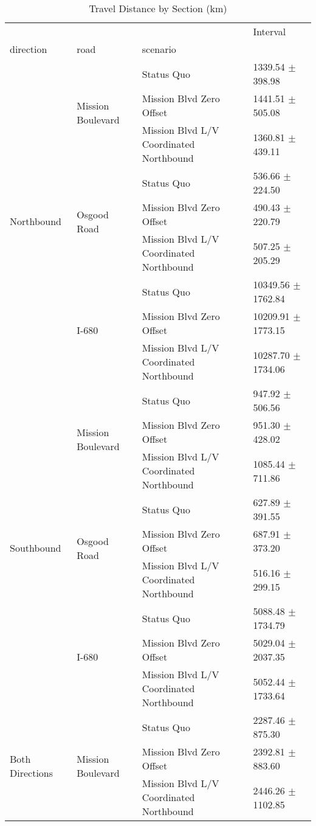 \begin{table}
\caption{Travel Distance by Section (km)}
\begin{tabular}{llll}
\toprule
 &  &  & Interval \\
direction & road & scenario &  \\
\midrule
\multirow[t]{9}{*}{Northbound} & \multirow[t]{3}{*}{Mission Boulevard} & Status Quo & 1339.54 $\pm$ 398.98 \\
 &  & Mission Blvd Zero Offset & 1441.51 $\pm$ 505.08 \\
 &  & Mission Blvd L/V Coordinated Northbound & 1360.81 $\pm$ 439.11 \\
 & \multirow[t]{3}{*}{Osgood Road} & Status Quo & 536.66 $\pm$ 224.50 \\
 &  & Mission Blvd Zero Offset & 490.43 $\pm$ 220.79 \\
 &  & Mission Blvd L/V Coordinated Northbound & 507.25 $\pm$ 205.29 \\
 & \multirow[t]{3}{*}{I-680} & Status Quo & 10349.56 $\pm$ 1762.84 \\
 &  & Mission Blvd Zero Offset & 10209.91 $\pm$ 1773.15 \\
 &  & Mission Blvd L/V Coordinated Northbound & 10287.70 $\pm$ 1734.06 \\
\multirow[t]{9}{*}{Southbound} & \multirow[t]{3}{*}{Mission Boulevard} & Status Quo & 947.92 $\pm$ 506.56 \\
 &  & Mission Blvd Zero Offset & 951.30 $\pm$ 428.02 \\
 &  & Mission Blvd L/V Coordinated Northbound & 1085.44 $\pm$ 711.86 \\
 & \multirow[t]{3}{*}{Osgood Road} & Status Quo & 627.89 $\pm$ 391.55 \\
 &  & Mission Blvd Zero Offset & 687.91 $\pm$ 373.20 \\
 &  & Mission Blvd L/V Coordinated Northbound & 516.16 $\pm$ 299.15 \\
 & \multirow[t]{3}{*}{I-680} & Status Quo & 5088.48 $\pm$ 1734.79 \\
 &  & Mission Blvd Zero Offset & 5029.04 $\pm$ 2037.35 \\
 &  & Mission Blvd L/V Coordinated Northbound & 5052.44 $\pm$ 1733.64 \\
\multirow[t]{9}{*}{Both Directions} & \multirow[t]{3}{*}{Mission Boulevard} & Status Quo & 2287.46 $\pm$ 875.30 \\
 &  & Mission Blvd Zero Offset & 2392.81 $\pm$ 883.60 \\
 &  & Mission Blvd L/V Coordinated Northbound & 2446.26 $\pm$ 1102.85 \\

\end{tabular}
\end{table}
